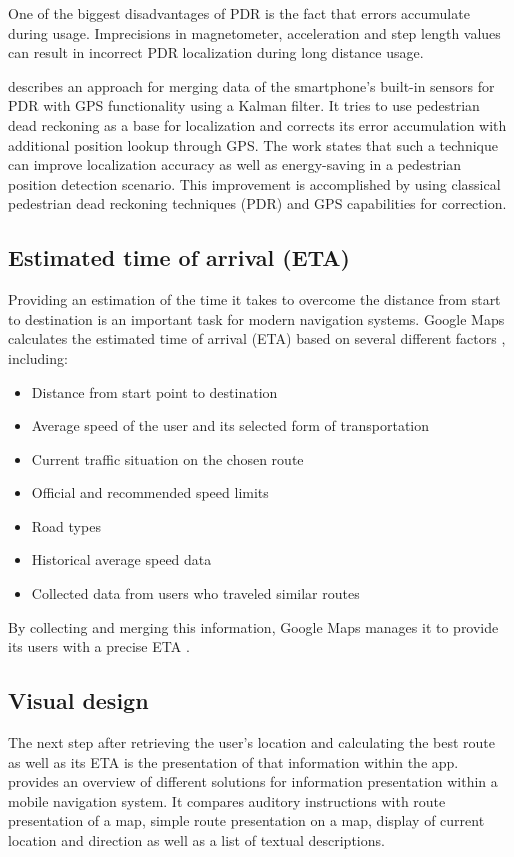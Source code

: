 One of the biggest disadvantages of PDR is the fact that errors accumulate during usage. Imprecisions in magnetometer, acceleration and step length values can result in incorrect PDR localization during long distance usage.

\cite{localization_techniques} describes an approach for merging data of the smartphone's built-in sensors for PDR with GPS functionality using a Kalman filter. It tries to use pedestrian dead reckoning as a base for localization and corrects its error accumulation with additional position lookup through GPS. The work states that such a technique can improve localization accuracy as well as energy-saving in a pedestrian position detection scenario. This improvement is accomplished by using classical pedestrian dead reckoning techniques (PDR) and GPS capabilities for correction.

\subsection{Estimated time of arrival (ETA)}
Providing an estimation of the time it takes to overcome the distance from start to destination is an important task for modern navigation systems. Google Maps calculates the estimated time of arrival (ETA) based on several different factors \cite{google_maps}, including:

\begin{itemize}
    \item Distance from start point to destination
    \item Average speed of the user and its selected form of transportation
    \item Current traffic situation on the chosen route
    \item Official and recommended speed limits
    \item Road types
    \item Historical average speed data
    \item Collected data from users who traveled similar routes
\end{itemize}

By collecting and merging this information, Google Maps manages it to provide its users with a precise ETA \cite{google_maps}.

\subsection{Visual design}
The next step after retrieving the user's location and calculating the best route as well as its ETA is the presentation of that information within the app. \cite{visual_design_of_navigation_system} provides an overview of different solutions for information presentation within a mobile navigation system. It compares auditory instructions with route presentation of a map, simple route presentation on a map, display of current location and direction as well as a list of textual descriptions.

